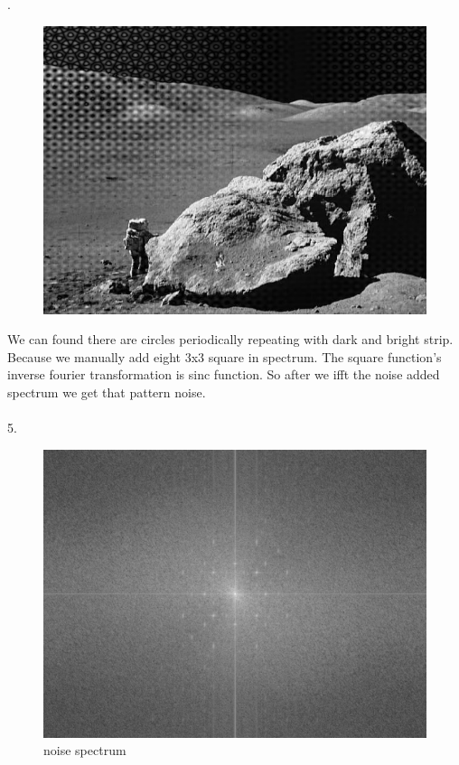 \documentclass[14pt]{article}
\begin{document}
		.~
			\begin{figure}[hbt!]
				\centering
				\includegraphics[width=\linewidth]{noise_added_img.png}
			\end{figure}
		We can found there are circles periodically repeating with dark and bright strip. Because we manually add eight 3x3 square in spectrum. The square function's inverse fourier transformation is sinc function. So after we ifft the noise added spectrum we get that pattern noise.\\\\
		5.~
			\begin{figure}[hbt!]
				\centering
				\includegraphics[width=\linewidth]{noise_spec.png}
				\caption{noise spectrum}
			\end{figure}
\end{document}
